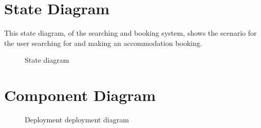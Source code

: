 \documentclass[a4paper]{article}
\begin{document}
\section{State Diagram}

This state diagram, of the searching and booking system, shows the scenario for
the user searching for and making an accommodation booking.

\begin{figure}[h!]
	\centering
	\caption{State diagram}
\end{figure}
\clearpage

\section{Component Diagram}
\begin{figure}[h!]
	\centering
	\caption{Deployment deployment diagram}
\end{figure}
\clearpage
\end{document}
